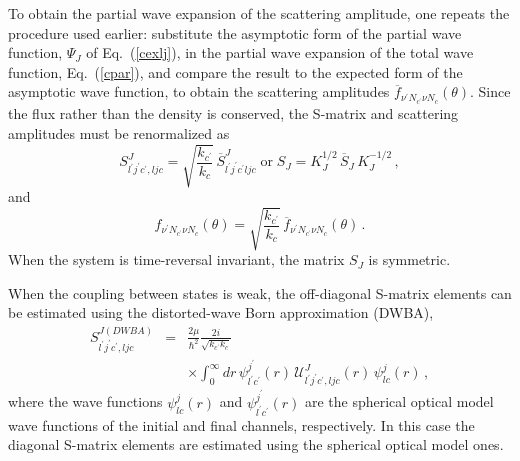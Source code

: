 \documentclass[twocolumn,amsmath,amssymb,10pt,groupedaddress,letter]{revtex4}
\begin{document}
To obtain the partial wave expansion of the scattering amplitude,
one repeats the procedure used earlier: substitute the asymptotic
form of the partial wave function, $\Psi_{J}$ of Eq.~(\ref{cexlj}),
in the partial wave expansion of the total wave function, Eq.~(\ref{cpar}),
and compare the result to the expected form of the asymptotic wave
function, to obtain the scattering amplitudes
$ \overline{f}_{\nu^{\prime}N_{c^{\prime}}\nu N_{c}}(\theta) $.
Since the flux rather than the density
is conserved, the S-matrix
and scattering amplitudes must be renormalized as \begin{equation}
S_{l^{\prime}j^{\prime}c^{\prime},ljc}^{J}=\sqrt{\frac{k_{c^{\prime}}}{k_{c}}}\,\overline{S}_{l^{\prime}j^{\prime}c^{\prime}ljc}^{J}\;\textrm{or}\; S_{J}=K_{J}^{1/2}\,\overline{S}_{J}\, K_{J}^{-1/2}\,,\end{equation}
 and \begin{equation}
f_{\nu^{\prime}N_{c^{\prime}}\nu N_{c}}(\theta)=\sqrt{\frac{k_{c^{\prime}}}{k_{c}}}\,\overline{f}_{\nu^{\prime}N_{c^{\prime}}\nu N_{c}}(\theta)\,.\end{equation}
When the system is time-reversal invariant, the matrix $S_{J}$ is
symmetric.

When the coupling between states is weak, the off-diagonal S-matrix
elements can be estimated using the distorted-wave Born approximation
(DWBA), \begin{eqnarray}
S_{l^{\prime}j^{\prime}c^{\prime},ljc}^{J(DWBA)} & = &
\frac{2\mu}{\hbar^2}\frac{2i}{\sqrt{k_{c^{\prime}}k_c}}
\\ & & \times  \int_0^{\infty}dr\,
  \psi_{l^{\prime}c^{\prime}}^{j^{\prime}}(r)\,{\mathcal{U}}_{l^{\prime}j^{\prime}c^{\prime},ljc}^{J}(r)\,\psi_{lc}^{j}(r)\,, \nonumber \end{eqnarray}
where the wave functions $\psi_{lc}^{j}(r)$ and
$\psi_{l^{\prime}c^{\prime}}^{j^{\prime}}(r)$ are the spherical optical model
wave functions of the initial and final channels, respectively. In this
case the diagonal S-matrix elements are estimated using the spherical
optical model ones.
\end{document}
